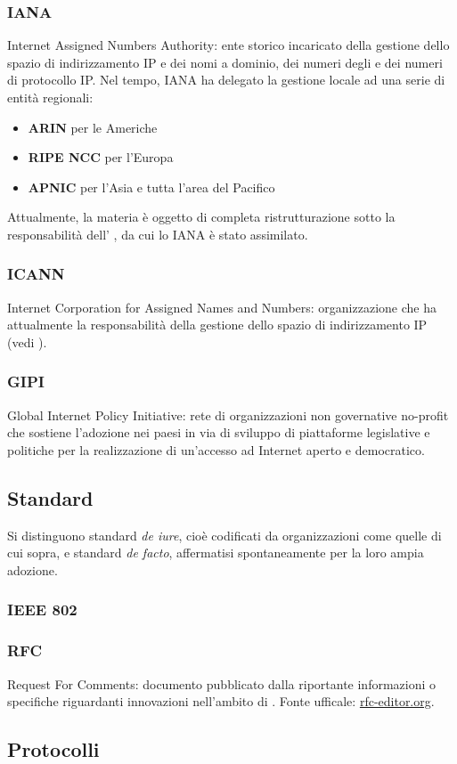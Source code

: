 \documentclass[a4paper,11pt]{article}
\def\sub#1{\subsection{#1}\label{#1}}
\def\subsub#1{\subsubsection{#1}\label{#1}}
\def\vedi#1{\nameref{#1}}
\begin{document}
\subsub{IANA}
Internet Assigned Numbers Authority: ente storico incaricato della gestione dello spazio di indirizzamento IP e dei nomi a dominio, dei numeri degli \vedi{AS} e dei numeri di protocollo IP. Nel tempo, IANA ha delegato la gestione locale ad una serie di entità regionali:
\begin{itemize}
\item \textbf{ARIN} per le Americhe
\item \textbf{RIPE NCC} per l'Europa
\item \textbf{APNIC} per l'Asia e tutta l'area del Pacifico
\end{itemize}
Attualmente, la materia è oggetto di completa ristrutturazione sotto la responsabilità dell’ \vedi{ICANN}, da cui lo IANA è stato assimilato.
\subsub{ICANN}
Internet Corporation for Assigned Names and Numbers: organizzazione che ha attualmente la responsabilità della gestione dello spazio di indirizzamento IP (vedi \vedi{IANA}).
\subsub{GIPI}
Global Internet Policy Initiative: rete di organizzazioni non governative no-profit che sostiene l’adozione nei paesi in via di sviluppo di piattaforme legislative e politiche per la realizzazione di un’accesso ad Internet aperto e democratico.
\sub{Standard}
Si distinguono standard \textit{de iure}, cioè codificati da organizzazioni come quelle di cui sopra, e standard \textit{de facto}, affermatisi spontaneamente per la loro ampia adozione.
\subsub{IEEE 802}
\subsub{RFC}
Request For Comments: documento pubblicato dalla \vedi{IETF} riportante informazioni o specifiche riguardanti innovazioni nell'ambito di \vedi{Internet}. Fonte ufficale: \url{rfc-editor.org}.
\sub{Protocolli} %
\end{document}
